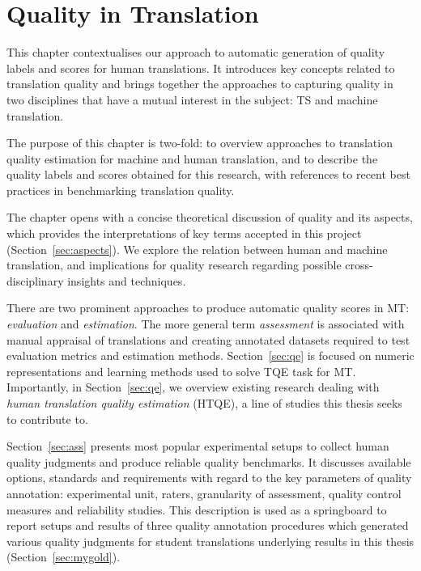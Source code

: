 \chapter{\label{cha:quest}Quality in Translation} %
This chapter contextualises our approach to automatic generation of quality labels and scores for human translations. It introduces key concepts related to translation quality and brings together the approaches to capturing quality in two disciplines that have a mutual interest in the subject: \gls{TS} and machine translation.

The purpose of this chapter is two-fold: to overview approaches to translation quality estimation for machine and human translation, and to describe the quality labels and scores obtained for this research, with references to recent best practices in benchmarking translation quality. 

The chapter opens with a concise theoretical discussion of quality and its aspects, which provides the interpretations of key terms accepted in this project (Section~\ref{sec:aspects}). We explore the relation between human and machine translation, and implications for quality research regarding possible cross-disciplinary insights and techniques.

There are two prominent approaches to produce automatic quality scores in MT: \textit{evaluation} and \textit{estimation}. The more general term \textit{assessment} is associated with manual appraisal of translations and creating annotated datasets required to test evaluation metrics and estimation methods. 
Section~\ref{sec:qe} is focused on numeric representations and learning methods used to solve \gls{TQE} task for MT. Importantly, in Section~\ref{sec:qe}, we overview existing research dealing with \textit{human translation quality estimation} (\gls{HTQE}), a line of studies this thesis seeks to contribute to. 

Section~\ref{sec:ass} presents most popular experimental setups to collect human quality judgments and produce reliable quality benchmarks. It discusses available options, standards and requirements with regard to the key parameters of quality annotation: experimental unit, raters, granularity of assessment, quality control measures and reliability studies. This description is used as a springboard to report setups and results of three quality annotation procedures which generated various quality judgments for student translations underlying results in this thesis (Section~\ref{sec:mygold}). 
 
